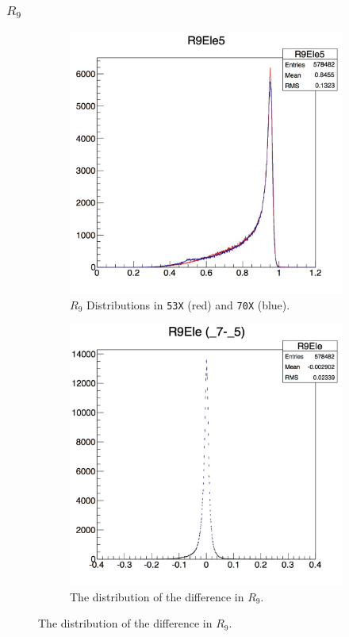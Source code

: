 \documentclass[10pt]{article}
\begin{document}
\subsubsection{$R_9$}
\begin{figure}[h!]
        \centering
        \begin{subfigure}[b]{0.4\textwidth}
                \includegraphics[width=\textwidth]{Plots/R9dist}
                \caption{$R_9$ Distributions in \texttt{53X} (red) and \texttt{70X} (blue).}
                \label{r9Dist}
        \end{subfigure}%
        \begin{subfigure}[b]{0.4\textwidth}
                \includegraphics[width=\textwidth]{Plots/R9}
                \caption{The distribution of the difference in $R_9$.}
                \label{r9Diff}
        \end{subfigure}
       

\end{figure}
\end{document}

